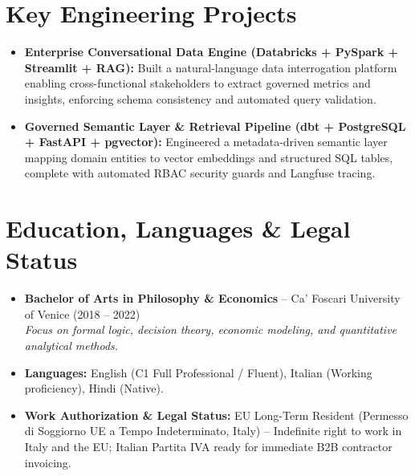 \documentclass[a4paper,10pt]{article}
\begin{document}
\section{Key Engineering Projects}
\begin{itemize}
  \item \textbf{Enterprise Conversational Data Engine (Databricks + PySpark + Streamlit + RAG):} Built a natural-language data interrogation platform enabling cross-functional stakeholders to extract governed metrics and insights, enforcing schema consistency and automated query validation.
  \item \textbf{Governed Semantic Layer \& Retrieval Pipeline (dbt + PostgreSQL + FastAPI + pgvector):} Engineered a metadata-driven semantic layer mapping domain entities to vector embeddings and structured SQL tables, complete with automated RBAC security guards and Langfuse tracing.
\end{itemize}

\section{Education, Languages \& Legal Status}
\begin{itemize}
  \item \textbf{Bachelor of Arts in Philosophy \& Economics} -- Ca' Foscari University of Venice (2018 -- 2022) \\
  \textit{Focus on formal logic, decision theory, economic modeling, and quantitative analytical methods.}
  \item \textbf{Languages:} English (C1 Full Professional / Fluent), Italian (Working proficiency), Hindi (Native).
  \item \textbf{Work Authorization \& Legal Status:} EU Long-Term Resident (Permesso di Soggiorno UE a Tempo Indeterminato, Italy) -- Indefinite right to work in Italy and the EU; Italian Partita IVA ready for immediate B2B contractor invoicing.
\end{itemize}
\end{document}
